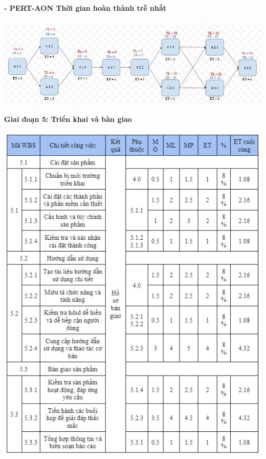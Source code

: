 \documentclass[12pt]{article}
\begin{document}
\hspace{1cm}\textbf{- PERT-AON Thời gian hoàn thành trễ nhất \\\\} 
\vspace*{0.5cm}    
\hspace{0.7cm}\includegraphics[width=14.5cm]{PERT4_2.png}
\vspace{0.5cm}  

\newpage

\begin{center}
    \textbf{Giai đoạn 5: Triển khai và bàn giao}
\end{center}
 
\includegraphics[width=14.5cm]{ThoiGian5_1.png}
\vspace{0.5cm}
\end{document}
